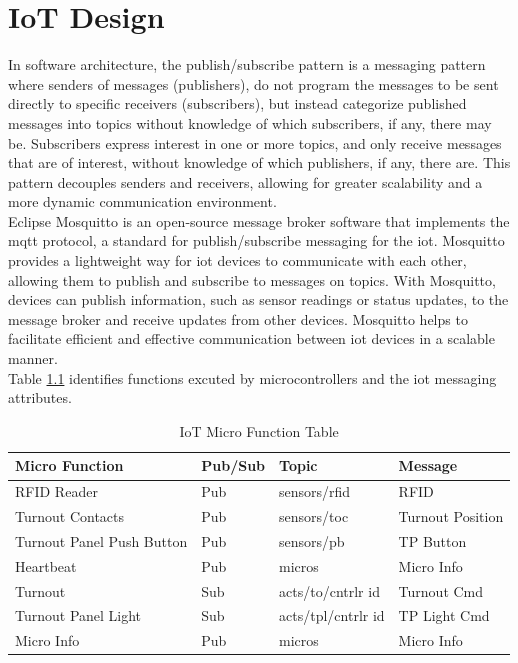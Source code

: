 \chapter{IoT Design}

In software architecture, the publish/subscribe pattern is a messaging pattern where senders of messages (publishers), do not program the messages to be sent directly to specific receivers (subscribers), but instead categorize published messages into topics without knowledge of which subscribers, if any, there may be. Subscribers express interest in one or more topics, and only receive messages that are of interest, without knowledge of which publishers, if any, there are. This pattern decouples senders and receivers, allowing for greater scalability and a more dynamic communication environment.\vspace{5mm} \\
Eclipse Mosquitto is an open-source message broker software that implements the \gls{mqtt} protocol, a standard for publish/subscribe messaging for the \gls{iot}. Mosquitto provides a lightweight way for \gls{iot} devices to communicate with each other, allowing them to publish and subscribe to messages on topics. With Mosquitto, devices can publish information, such as sensor readings or status updates, to the message broker and receive updates from other devices. Mosquitto helps to facilitate efficient and effective communication between \gls{iot} devices in a scalable manner.\vspace{5mm} \\
Table \ref{iot-table} identifies functions excuted by microcontrollers and the \gls{iot} messaging attributes.\vspace{5mm} \\

\begin{table}[!ht]
    \begin{center}
    \begin{tabular}{|l|l|l|l|}
    \hline
        \textbf{Micro Function} & \textbf{Pub/Sub} & \textbf{Topic} & \textbf{Message} \\ \hline
        RFID Reader & Pub & sensors/rfid & RFID \\ \hline
        Turnout Contacts & Pub & sensors/toc & Turnout Position\\ \hline
        Turnout Panel Push Button & Pub & sensors/pb & TP Button \\ \hline
        Heartbeat & Pub & micros & Micro Info\\ \hline
        Turnout & Sub & acts/to/cntrlr id &  Turnout Cmd\\ \hline
        Turnout Panel Light & Sub & acts/tpl/cntrlr id & TP Light Cmd\\ \hline
        Micro Info & Pub & micros & Micro Info\\ \hline
    \end{tabular}
    \caption{\label{iot-table}IoT Micro Function Table}
    \end{center}
\end{table}

